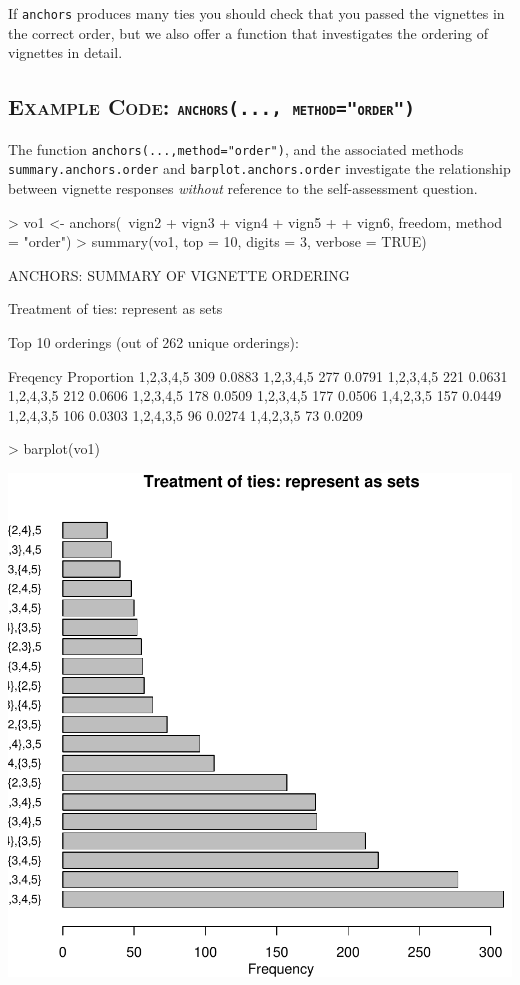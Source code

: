 \documentclass{amsart}
\newcommand{\code}[1]{{\texttt{#1}}}
\newcommand{\ssubsection}[2]{%
  \subsection[#1]{\normalfont\scshape #1: {\tt #2}}}
\begin{document}
If \texttt{anchors} produces many ties you should check that you
passed the vignettes in the correct order, but we also offer a
function that investigates the ordering of vignettes in detail.

\ssubsection{Example Code}{anchors(..., method="order")}

The function \code{anchors(...,method="order")}, and the associated methods
\code{summary.anchors.order} and \code{barplot.anchors.order}
investigate the relationship between vignette responses {\em without}
reference to the self-assessment question.

\begin{Schunk}
\begin{Sinput}
> vo1 <- anchors(~vign2 + vign3 + vign4 + vign5 + 
+     vign6, freedom, method = "order")
> summary(vo1, top = 10, digits = 3, verbose = TRUE)
\end{Sinput}
\begin{Soutput}
ANCHORS: SUMMARY OF VIGNETTE ORDERING

Treatment of ties: represent as sets 

Top 10 orderings (out of 262 unique orderings):

              Freqency Proportion
1,{2,3,4,5}        309     0.0883
{1,2,3,4,5}        277     0.0791
1,2,{3,4,5}        221     0.0631
1,{2,4},{3,5}      212     0.0606
1,2,{3,4},5        178     0.0509
1,{2,3,4},5        177     0.0506
1,4,{2,3,5}        157     0.0449
1,2,4,{3,5}        106     0.0303
1,{2,4},3,5         96     0.0274
1,4,2,{3,5}         73     0.0209
\end{Soutput}
\begin{Sinput}
> barplot(vo1)
\end{Sinput}
\end{Schunk}
\includegraphics{anchors-vignette-order}
\end{document}
